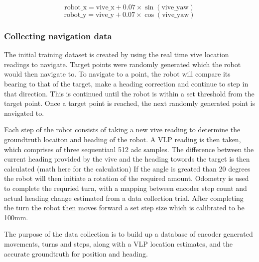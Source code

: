 \[
\text{robot\_x} = \text{vive\_x} + 0.07 \times \sin(\text{vive\_yaw})
\]
\[
\text{robot\_y} = \text{vive\_y} + 0.07 \times \cos(\text{vive\_yaw})
\]






\subsubsection{Collecting navigation data}
The initial training dataset is created by using the real time vive location readings to navigate. 
Target points were randomly generated which the robot would then navigate to. 
To navigate to a point, the robot will compare its bearing to that of the target, make a heading correction and continue to step in that direction.
This is continued until the robot is within a set threshold from the target point.
Once a target point is reached, the next randomly generated point is navigated to.

Each step of the robot consists of taking a new vive reading to determine the groundtruth locaiton and heading of the robot. 
A VLP reading is then taken, which comprises of three sequentianl 512 adc samples. 
The difference between the current heading provided by the vive and the heading towords the target is then calculated
(math here for the calculation)
If the angle is greated than 20 degrees the robot will then initiate a rotation of the required amount. 
Odometry is used to complete the requried turn, with a mapping between encoder step count and actual heading change estimated from a data collection trial. 
After completing the turn the robot then moves forward a set step size which is calibrated to be 100mm. 

The purpose of the data collection is to build up a database of encoder generated movements, turns and steps, along with a VLP location estimates, and the accurate groundtruth for position and heading.





